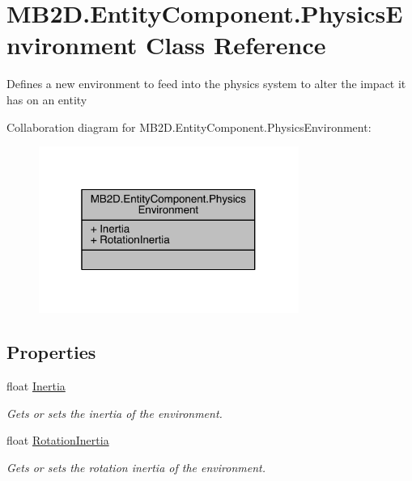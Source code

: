 \hypertarget{class_m_b2_d_1_1_entity_component_1_1_physics_environment}{}\section{M\+B2\+D.\+Entity\+Component.\+Physics\+Environment Class Reference}
\label{class_m_b2_d_1_1_entity_component_1_1_physics_environment}


Defines a new environment to feed into the physics system to alter the impact it has on an entity  




Collaboration diagram for M\+B2\+D.\+Entity\+Component.\+Physics\+Environment\+:
\nopagebreak
\begin{figure}[H]
\begin{center}
\leavevmode
\includegraphics[width=241pt]{class_m_b2_d_1_1_entity_component_1_1_physics_environment__coll__graph}
\end{center}
\end{figure}
\subsection*{Properties}
\begin{DoxyCompactItemize}
\item 
float \hyperlink{class_m_b2_d_1_1_entity_component_1_1_physics_environment_a67ab743dbbe138e3eac38871e51c21d6}{Inertia}
\begin{DoxyCompactList}\small\item\em Gets or sets the inertia of the environment. \end{DoxyCompactList}\item 
float \hyperlink{class_m_b2_d_1_1_entity_component_1_1_physics_environment_a1c2fdbef41b7dee04b59200dd5d90cdc}{Rotation\+Inertia}
\begin{DoxyCompactList}\small\item\em Gets or sets the rotation inertia of the environment. \end{DoxyCompactList}\end{DoxyCompactItemize}


